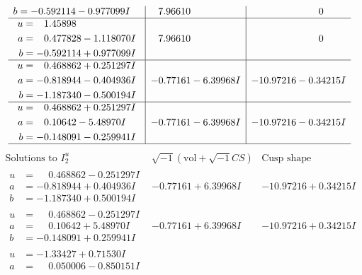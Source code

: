 \documentclass[1p]{elsarticle_modified}
\theoremstyle{definition}
\newcommand{\I}{\sqrt{-1}}
\begin{document}
$$\begin{array}{c|c|c}
\begin{aligned}
b &= -0.592114 - 0.977099 I\end{aligned}
 & \phantom{-}7.96610\phantom{ +0.000000I} & \phantom{-0.000000 } 0 \\ \hline\begin{aligned}
u &= \phantom{-}1.45898\phantom{ +0.000000I} \\
a &= \phantom{-}0.477828 - 1.118070 I \\
b &= -0.592114 + 0.977099 I\end{aligned}
 & \phantom{-}7.96610\phantom{ +0.000000I} & \phantom{-0.000000 } 0 \\ \hline\begin{aligned}
u &= \phantom{-}0.468862 + 0.251297 I \\
a &= -0.818944 - 0.404936 I \\
b &= -1.187340 - 0.500194 I\end{aligned}
 & -0.77161 - 6.39968 I & -10.97216 - 0.34215 I \\ \hline\begin{aligned}
u &= \phantom{-}0.468862 + 0.251297 I \\
a &= \phantom{-}0.10642 - 5.48970 I \\
b &= -0.148091 - 0.259941 I\end{aligned}
 & -0.77161 - 6.39968 I & -10.97216 - 0.34215 I\\
 \hline 
 \end{array}$$\newpage$$\begin{array}{c|c|c}  
\text{Solutions to }I^u_{2}& \I (\text{vol} + \sqrt{-1}CS) & \text{Cusp shape}\\
 \hline 
\begin{aligned}
u &= \phantom{-}0.468862 - 0.251297 I \\
a &= -0.818944 + 0.404936 I \\
b &= -1.187340 + 0.500194 I\end{aligned}
 & -0.77161 + 6.39968 I & -10.97216 + 0.34215 I \\ \hline\begin{aligned}
u &= \phantom{-}0.468862 - 0.251297 I \\
a &= \phantom{-}0.10642 + 5.48970 I \\
b &= -0.148091 + 0.259941 I\end{aligned}
 & -0.77161 + 6.39968 I & -10.97216 + 0.34215 I \\ \hline\begin{aligned}
u &= -1.33427 + 0.71530 I \\
a &= \phantom{-}0.050006 - 0.850151 I \\

\end{aligned}
\end{array}$$
\end{document}
